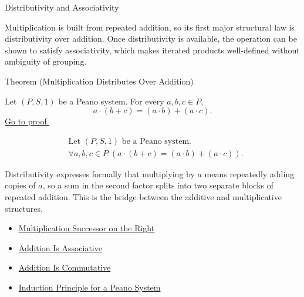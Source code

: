 \begin{topicbox}{Distributivity and Associativity}
\begin{exposition}
Multiplication is built from repeated addition, so its first major structural
law is distributivity over addition. Once distributivity is available, the
operation can be shown to satisfy associativity, which makes iterated products
well-defined without ambiguity of grouping.
\end{exposition}

\begin{theorembox}{Theorem (Multiplication Distributes Over Addition)}
\begin{theorem}
\label{thm:multiplication-distributes-over-addition}
Let $(P,S,1)$ be a Peano system. For every $a,b,c \in P$,
\[
a \cdot (b+c) = (a \cdot b) + (a \cdot c).
\]
\hyperref[prf:multiplication-distributes-over-addition]{Go to proof.}
\end{theorem}
\end{theorembox}

\begin{remark*}
\[
\begin{aligned}
&\text{Let } (P,S,1) \text{ be a Peano system.}\\
&\forall a,b,c \in P\;(a \cdot (b+c) = (a \cdot b) + (a \cdot c)).
\end{aligned}
\]
\end{remark*}

\begin{remark*}[Interpretation]
Distributivity expresses formally that multiplying by $a$ means repeatedly
adding copies of $a$, so a sum in the second factor splits into two separate
blocks of repeated addition. This is the bridge between the additive and
multiplicative structures.
\end{remark*}

\begin{dependencies}
\begin{itemize}
  \item \hyperref[thm:multiplication-successor-on-right]{Multiplication Successor on the Right}
  \item \hyperref[thm:addition-associative]{Addition Is Associative}
  \item \hyperref[thm:addition-commutative]{Addition Is Commutative}
  \item \hyperref[thm:induction-principle-for-peano-system]{Induction Principle for a Peano System}
\end{itemize}
\end{dependencies}


\end{topicbox}
